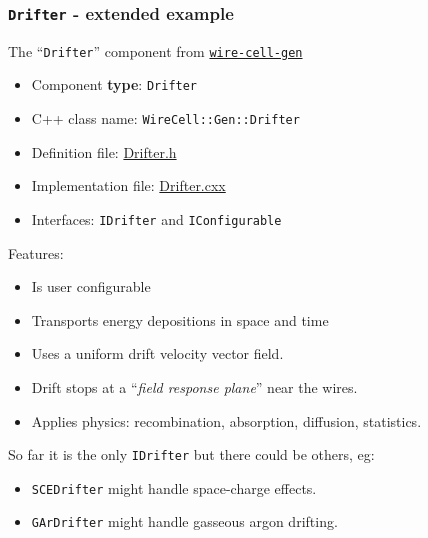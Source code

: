 \documentclass[xcolor=dvipsnames]{beamer}
\begin{document}
\begin{frame}
  \frametitle{\texttt{Drifter} - extended example}

  \footnotesize

  The ``\texttt{Drifter}'' component from \href{https://github.com/WireCell/wire-cell-gen/}{\texttt{wire-cell-gen}}
  \begin{itemize}\scriptsize
  \item Component \textbf{type}: \texttt{Drifter}
  \item C++ class name: \texttt{WireCell::Gen::Drifter}
  \item Definition file: \href{https://github.com/WireCell/wire-cell-gen/blob/master/inc/WireCellGen/Drifter.h}{Drifter.h}
  \item Implementation file: \href{https://github.com/WireCell/wire-cell-gen/blob/master/src/Drifter.cxx}{Drifter.cxx}
  \item Interfaces: \texttt{IDrifter} and \texttt{IConfigurable}
  \end{itemize}
  Features:
  \begin{itemize}\scriptsize
  \item Is user configurable
  \item Transports energy depositions in space and time
  \item Uses a uniform drift velocity vector field.
  \item Drift stops at a ``\textit{field response plane}'' near the wires.
  \item Applies physics: recombination, absorption, diffusion, statistics.
  \end{itemize}

  \vfill\footnotesize
  So far it is the only \texttt{IDrifter} but there could be
  others, eg:
  \begin{itemize}\scriptsize
  \item \texttt{SCEDrifter} might handle space-charge effects.
  \item \texttt{GArDrifter} might handle gasseous argon drifting.
  \end{itemize}


\end{frame}
\end{document}
